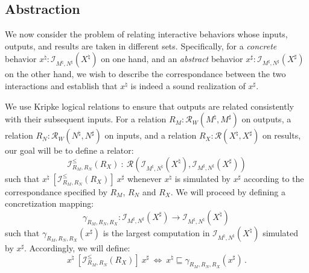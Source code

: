 \documentclass[acmsmall,timestamp,review,anonymous]{acmart}
\newcommand{\ifr}[1]{\ [{#1}]\ }
\begin{document}

\subsection{Abstraction} \label{sec:monad:abs} %

We now consider the problem of relating interactive behaviors
whose inputs, outputs, and results are taken in different sets.
Specifically,
for a \emph{concrete} behavior
$x^\natural : \mathcal{I}_{M^\natural,N^\natural}(X^\natural)$
on one hand, and an \emph{abstract} behavior
$x^\sharp : \mathcal{I}_{M^\sharp,N^\sharp}(X^\sharp)$
on the other hand,
we wish to describe the correspondance between
the two interactions
and establish that
$x^\natural$ is indeed a sound realization of $x^\sharp$.

We use Kripke logical relations to ensure that
outputs are related consistently with their subsequent inputs.
For
a relation $R_M : \mathcal{R}_W(M^\natural, M^\sharp)$ on outputs,
a relation $R_N : \mathcal{R}_W(N^\natural, N^\sharp)$ on inputs,
and a relation $R_X : \mathcal{R}(X^\natural, X^\sharp)$ on results,
our goal will be to define a relator:
\[ \mathcal{I}^\le_{R_M,R_N}(R_X) \: : \:
   \mathcal{R}(\mathcal{I}_{M^\natural,N^\natural}(X^\natural),
               \mathcal{I}_{M^\sharp,N^\sharp}(X^\sharp)) \]
such that $x^\natural \ifr{\mathcal{I}^\le_{R_M,R_N}(R_X)} x^\sharp$
whenever $x^\natural$ is simulated by $x^\sharp$ according to
the correspondance specified by $R_M$, $R_N$ and $R_X$.
We will proceed by defining a concretization mapping:
\[ \gamma_{R_M,R_N,R_X} : \mathcal{I}_{M^\sharp,N^\sharp}(X^\sharp) \rightarrow
                    \mathcal{I}_{M^\natural,N^\natural}(X^\natural) \, \]
such that $\gamma_{R_M, R_N, R_X}(x^\sharp)$ is
the largest computation in $\mathcal{I}_{M^\natural,N^\natural}(X^\natural)$
simulated by $x^\sharp$.
Accordingly,
we will define:
\[ x^\natural \ifr{\mathcal{I}^\le_{R_M,R_N}(R_X)} x^\sharp
   \: \Leftrightarrow \:
   x^\natural \sqsubseteq \gamma_{R_M,R_N,R_X}(x^\sharp) \,. \]
\end{document}
